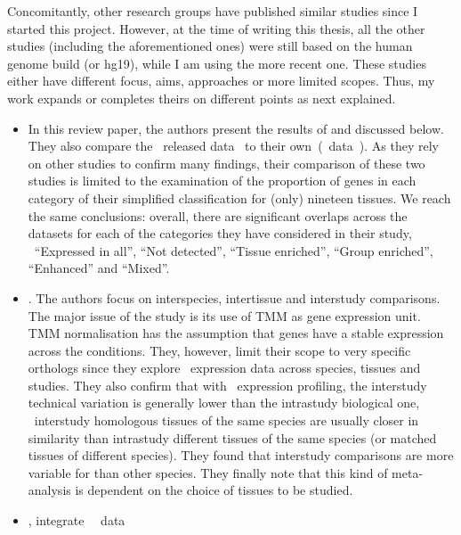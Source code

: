 Concomitantly, other research groups have published similar studies
since I started this project.
However, at the time of writing this thesis,
all the other studies (including the aforementioned ones)
were still based on the human genome build  (or hg19),
while I am using the more recent  one.
These studies either have different focus, aims,
approaches or more limited scopes.
Thus, my work expands or completes theirs on different points as next explained.
\begin{itemize}[topsep=0pt,nosep]
\item{} In this review paper,
the authors present the results of \citet{Yu2015-uh} and \citet{Danielsson2015-cn}
discussed below.
They also compare the \gtex\ released data~
to their own~(\uhlen\ data~).
As they rely on other studies to confirm many findings,
their comparison of these two studies is
limited to the examination of
the proportion of genes in each category of their simplified classification
for (only) nineteen tissues.
We reach the same conclusions:
overall, there are significant overlaps across the datasets for each of the
categories they have considered in their study, \ie\ \enquote{Expressed in all},
\enquote{Not detected}, \enquote{Tissue enriched}, \enquote{Group enriched},
\enquote{Enhanced} and \enquote{Mixed}.
\item{}.
The authors focus on interspecies, intertissue and interstudy comparisons.
The major issue of the study is its use of \gls{TMM} as gene expression unit.
\gls{TMM} normalisation has the assumption that
genes have a stable expression across the conditions.
They, however, limit their scope to very specific orthologs
since they explore \Rnaseq\ expression data across species, tissues and studies.
They also confirm that with \Rnaseq\ expression profiling,
the interstudy technical variation is generally lower than
the intrastudy biological one, \ie\
interstudy homologous tissues of the same species are usually
closer in similarity than intrastudy different tissues of the same species
(or matched tissues of different species).
They found that interstudy comparisons are more variable for 
than other species.
They finally note that this kind of meta-analysis is dependent on
the choice of tissues to be studied.
\item{}, integrate \uhlen\ \etal\ data~

\end{itemize}
